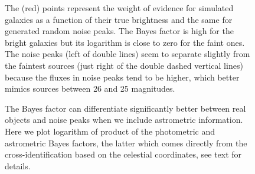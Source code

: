 \documentclass[twocolumn]{emulateapj}
\begin{document}
\begin{figure}
\caption{The (red) points represent the weight of evidence for simulated galaxies as a function of their true brightness and the same for generated random noise peaks. The Bayes factor is high for the bright galaxies but its logarithm is close to zero for the faint ones. The noise peaks (left of double lines) seem to separate slightly from the faintest sources (just right of the double dashed vertical lines) because the fluxes in noise peaks tend to be higher, which better mimics sources between 26 and 25 magnitudes.}
\label{fig:bf}
\end{figure}

\begin{figure}
\caption{The Bayes factor can differentiate significantly better between real objects and noise peaks when we include astrometric information. Here we plot logarithm of product of the photometric and astrometric Bayes factors, the latter which comes directly from the cross-identification based on the celestial coordinates, see text for details.}
\label{fig:bf2}
\end{figure}



\end{document}
